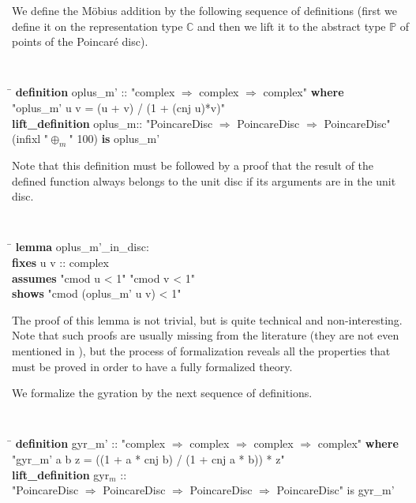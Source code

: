 \documentclass[a4paper]{article}
\newcommand{\tab}{\hspace{5mm}}
\theoremstyle{definition}
\begin{document}
We define the M\"obius addition by the following sequence of
definitions (first we define it on the representation type
$\mathbb{C}$ and then we lift it to the abstract type $\mathbb{P}$ of
points of the Poincar\'e disc).

{\tt
\begin{small}
\begin{tabbing}
\hspace{5mm}\=\kill
{\bf definition} oplus\_m' :: "complex $\Rightarrow$ complex $\Rightarrow$ complex" {\bf where}\\
\tab "oplus\_m' u v = (u + v) / (1 + (cnj u)*v)"\\

{\bf lift\_definition} oplus\_m:: "PoincareDisc $\Rightarrow$ PoincareDisc $\Rightarrow$ PoincareDisc" \\
\tab (infixl "$\oplus_m$" 100) {\bf is} oplus\_m'
\end{tabbing}
\end{small}
}

Note that this definition must be followed by a proof that the result
of the defined function always belongs to the unit disc if its
arguments are in the unit disc.

{\tt
\begin{small}
\begin{tabbing}
\hspace{5mm}\=\kill
{\bf lemma} oplus\_m'\_in\_disc:\\
\>  {\bf fixes} u v :: complex\\
\>  {\bf assumes} "cmod u < 1" "cmod v < 1"\\
\>  {\bf shows} "cmod (oplus\_m' u v) < 1"
\end{tabbing}
\end{small}
}

\noindent The proof of this lemma is not trivial, but is quite
technical and non-interesting. Note that such proofs are usually
missing from the literature (they are not even mentioned in
\cite{ungar-analytic}), but the process of formalization reveals all
the properties that must be proved in order to have a fully formalized
theory.

We formalize the gyration by the next sequence of definitions.

{\tt
\begin{small}
\begin{tabbing}
\hspace{5mm}\=\kill
{\bf definition} gyr\_m' :: "complex $\Rightarrow$ complex $\Rightarrow$ complex $\Rightarrow$ complex" {\bf where}\\
\>  "gyr\_m' a b z = ((1 + a * cnj b) / (1 + cnj a * b)) * z"\\
{\bf lift\_definition} gyr$_m$ ::\\
\>"PoincareDisc $\Rightarrow$ PoincareDisc $\Rightarrow$ PoincareDisc $\Rightarrow$ PoincareDisc" is gyr\_m'
\end{tabbing}
\end{small}
}
\end{document}
